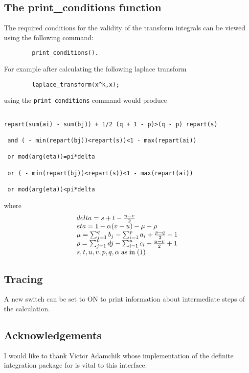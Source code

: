 \subsection{The print\_conditions function}

\rm The required conditions for the validity of the transform integrals
can be viewed using the following command:

\begin{verbatim}
        print_conditions().
\end{verbatim}

For example after calculating the following laplace transform

\begin{verbatim}
        laplace_transform(x^k,x);
\end{verbatim}

using the \verb+print_conditions+ command would produce

\begin{verbatim}
                         
repart(sum(ai) - sum(bj)) + 1/2 (q + 1 - p)>(q - p) repart(s)
                         
 and ( - min(repart(bj))<repart(s))<1 - max(repart(ai)) 

 or mod(arg(eta))=pi*delta

 or ( - min(repart(bj))<repart(s))<1 - max(repart(ai)) 

 or mod(arg(eta))<pi*delta

\end{verbatim}

where
\begin{displaymath}
\begin{array}{ll}
delta = s+t-\frac{u-v}{2}\\
eta = 1-\alpha(v-u)-\mu-\rho\\
\mu = \sum_{j=1}^{q} b_{j} - \sum_{i=1}^{p} a_{i} + \frac{p-q}{2} + 1\\
\rho = \sum_{j=1}^{v} d{j} - \sum_{i=1}^{u} c_{i} + \frac{u-v}{2} + 1\\
s,t,u,v,p,q,\alpha \; {\rm as \; in \; (1)}
\end{array}
\end{displaymath}


\subsection{Tracing}
\hypertarget{switch:TRDEFINT}{}

A new switch  can be set to ON to print information about intermediate steps 
of the calculation.

\subsection{Acknowledgements}
I would like to thank Victor Adamchik whose implementation of the 
definite integration package for {\REDUCE} is vital to this
interface.  



